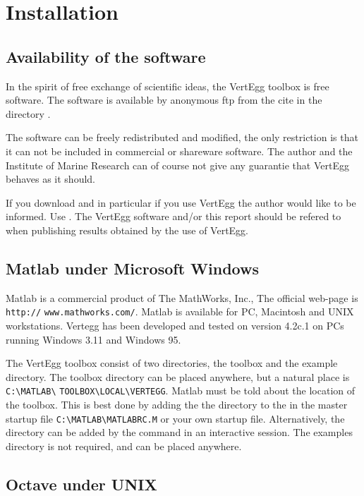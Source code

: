 
\chapter{Installation}

\section{Availability of the software}

In the spirit of free exchange of scientific ideas, the VertEgg toolbox
is free software. The software is available by anonymous ftp from
the cite  in the directory .

The software  can be freely redistributed and modified, the only
restriction is that it can not be included in commercial or 
shareware software. The author and the Institute of Marine Research
can of course not give any guarantie that VertEgg behaves as it should.

If you download and in particular if you use VertEgg the author would
like to be informed. Use . The VertEgg
software and/or this report should be refered to when publishing results
obtained by the use of VertEgg.

\section{Matlab under Microsoft Windows}

Matlab is a commercial product of The MathWorks, Inc., The
official web-page is \verb+http://+ \verb+www.mathworks.com/+. Matlab is
available for PC, Macintosh and UNIX workstations.  Vertegg has been
developed and tested on version 4.2c.1 on PCs running Windows 3.11 and
Windows 95. 

The VertEgg toolbox consist of two directories, the toolbox and the
example directory. The toolbox directory can be placed anywhere, but a
natural place is \verb+C:\MATLAB\+ \verb+TOOLBOX\LOCAL\VERTEGG+.
Matlab must be told about the location of the toolbox. This is best
done by adding the the directory to the  in the master
startup file \verb+C:\MATLAB\MATLABRC.M+ or your own startup file.
Alternatively, the directory can be added by the  command in
an interactive session.  The examples directory is not required, and
can be placed anywhere.


\section{Octave under UNIX}

